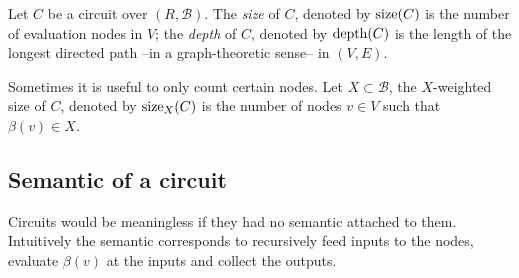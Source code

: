 \begin{definition}
  \label{def:size}
  Let $C$ be a circuit over $(R,\mathcal{B})$. The
  \emph{size} of $C$, denoted by
  $\operatorname{size}(C)$ is the number of
  evaluation nodes in $V$; the
  \emph{depth} of $C$, denoted by
  $\operatorname{depth}(C)$ is the length of the longest directed path
  --in a graph-theoretic sense-- in $(V,E)$.

  Sometimes it is useful to only count certain nodes. Let
  $X\subset\mathcal{B}$, the
  $X$-weighted size of $C$,
  denoted by $\operatorname{size}_X(C)$ is the number of nodes $v\in V$ such that
  $\beta(v)\in X$.
\end{definition}


\subsection{Semantic of a circuit}
\label{sec:semantic-circuit}
Circuits would be meaningless if they had no semantic attached to
them. Intuitively the semantic corresponds to recursively feed inputs
to the nodes, evaluate $\beta(v)$ at the inputs and collect the
outputs.


